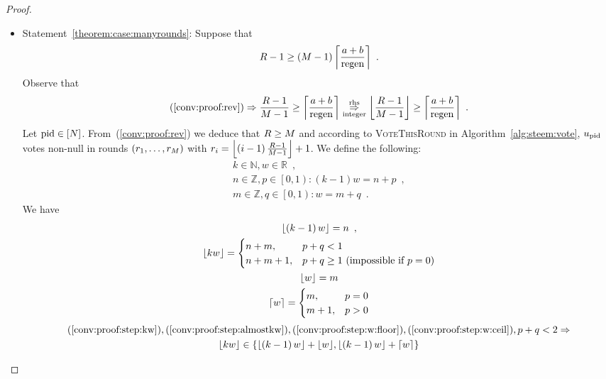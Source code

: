 \begin{proof}
  \begin{itemize}
    \item Statement~\ref{theorem:case:manyrounds}: Suppose that
    \begin{equation}
      \label{conv:proof:rev}
      \rounds - 1 \geq \left(\postlen - 1\right)\ceil*{\frac{a+b}{\regen}}
      \enspace.
    \end{equation}
    Observe that
    \begin{equation}
      \label{conv:proof:integer}
      \left(\ref{conv:proof:rev}\right) \Rightarrow \frac{\rounds - 1}{\postlen
      - 1} \geq \ceil*{\frac{a+b}{\regen}}
      \underset{\text{integer}}{\overset{\text{rhs}}{\Rightarrow}}
      \floor*{\frac{\rounds - 1}{\postlen - 1}} \geq \ceil*{\frac{a+b}{\regen}}
      \enspace.
    \end{equation}
    Let $\pid \in \left[\playerlen\right]$. From~(\ref{conv:proof:rev}) we
    deduce that $\rounds \geq \postlen$ and according to \textsc{VoteThisRound}
    in Algorithm~\ref{alg:steem:vote}, $u_{\pid}$ votes non-null in rounds
    $\left(\round_1, \dots, \round_\postlen\right)$ with $r_i = \floor*{\left(i
    - 1\right)\frac{\rounds - 1}{\postlen - 1}} + 1$. We define the following:
    \begin{gather*}
      k \in \mathbb{N}, w \in \mathbb{R} \enspace, \\
      n \in \mathbb{Z}, p \in \left[0, 1\right) : \left(k - 1\right)w = n + p
      \enspace, \\
      m \in \mathbb{Z}, q \in \left[0, 1\right) : w = m + q \enspace.
    \end{gather*}
    We have
    \begin{gather}
      \label{conv:proof:step:kw}
      \floor*{\left(k - 1\right)w} = n \enspace, \\
      \label{conv:proof:step:almostkw}
      \floor*{kw} =
      \begin{cases}
        n + m, & p + q < 1 \\
        n + m + 1, & p + q \geq 1 \text{ (impossible if } p = 0\text{)}
      \end{cases} \\
      \label{conv:proof:step:w:floor}
      \floor*{w} = m \\
      \label{conv:proof:step:w:ceil}
      \ceil*{w} =
      \begin{cases}
        m, & p = 0 \\
        m + 1, & p > 0
      \end{cases}
    \end{gather}
    \begin{equation}
      \label{conv:proof:step:floors}
      \begin{gathered}
        (\ref{conv:proof:step:kw}), (\ref{conv:proof:step:almostkw}),
        (\ref{conv:proof:step:w:floor}), (\ref{conv:proof:step:w:ceil}), p + q <
        2 \Rightarrow \\
        \floor*{kw} \in \left\{\floor*{\left(k - 1\right)w} + \floor*{w},
        \floor*{\left(k - 1\right)w} + \ceil*{w}\right\}
      \end{gathered}
    \end{equation}


\end{itemize}
\end{proof}
